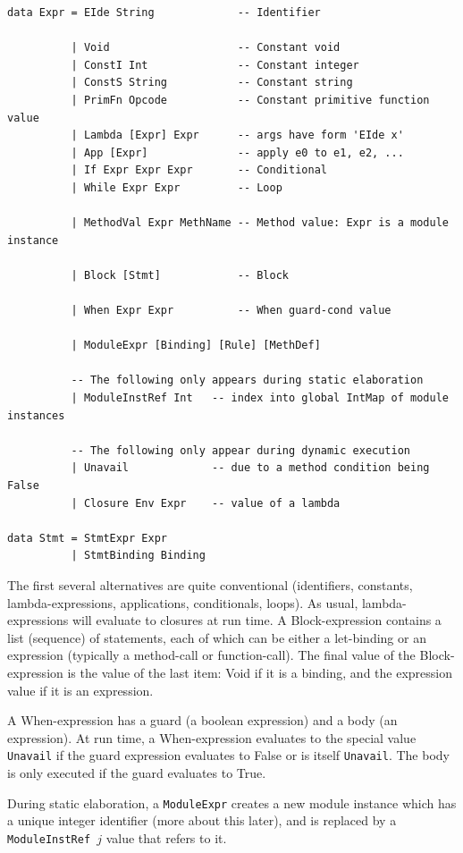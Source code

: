 \documentclass[11pt]{article}
\newcommand{\term}[1]{\texttt{#1}}
\begin{document}
\begin{Verbatim}[frame=single, commandchars=\\\{\}]
data Expr = EIde String             -- Identifier

          | Void                    -- Constant void
          | ConstI Int              -- Constant integer
          | ConstS String           -- Constant string
          | PrimFn Opcode           -- Constant primitive function value
          | Lambda [Expr] Expr      -- args have form 'EIde x'
          | App [Expr]              -- apply e0 to e1, e2, ...
          | If Expr Expr Expr       -- Conditional
          | While Expr Expr         -- Loop

          | MethodVal Expr MethName -- Method value: Expr is a module instance

          | Block [Stmt]            -- Block

          | When Expr Expr          -- When guard-cond value

          | ModuleExpr [Binding] [Rule] [MethDef]

          -- The following only appears during static elaboration
          | ModuleInstRef Int   -- index into global IntMap of module instances

          -- The following only appear during dynamic execution
          | Unavail             -- due to a method condition being False
          | Closure Env Expr    -- value of a lambda

data Stmt = StmtExpr Expr
          | StmtBinding Binding
\end{Verbatim}

The first several alternatives are quite conventional (identifiers,
constants, lambda-expressions, applications, conditionals, loops).  As
usual, lambda-expressions will evaluate to closures at run time.  A
Block-expression contains a list (sequence) of statements, each of
which can be either a let-binding or an expression (typically a
method-call or function-call).  The final value of the
Block-expression is the value of the last item: Void if it is a
binding, and the expression value if it is an expression.

A When-expression has a guard (a boolean expression) and a body (an
expression).  At run time, a When-expression evaluates to the special
value \term{Unavail} if the guard expression evaluates to False or is
itself \term{Unavail}.  The body is only executed if the guard
evaluates to True.

During static elaboration, a \term{ModuleExpr} creates a new module
instance which has a unique integer identifier (more about this
later), and is replaced by a \term{ModuleInstRef~$j$} value that
refers to it.
\end{document}

